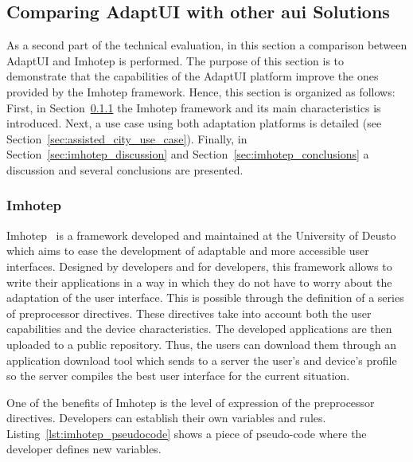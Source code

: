 \subsection{Comparing AdaptUI with other \ac{aui} Solutions}
\label{sec:imhotep_comparison}

As a second part of the technical evaluation, in this section a comparison 
between AdaptUI and Imhotep is performed. The purpose of this section is to 
demonstrate that the capabilities of the AdaptUI platform improve the ones 
provided by the Imhotep framework. Hence, this section is organized as follows: 
First, in Section~\ref{sec:imhotep_vs_adaptui} the Imhotep framework and its 
main characteristics is introduced. Next, a use case using both adaptation 
platforms is detailed (see Section~\ref{sec:assisted_city_use_case}). Finally, 
in Section~\ref{sec:imhotep_discussion} and Section~\ref{sec:imhotep_conclusions} 
a discussion and several conclusions are presented.

\subsubsection{Imhotep}
\label{sec:imhotep_vs_adaptui}

Imhotep~\citep{almeida_imhotep_2011} is a framework developed and maintained at
the University of Deusto which aims to ease the development of adaptable and 
more accessible user interfaces. Designed by developers and for developers, this
framework allows to write their applications in a way in which they do not
have to worry about the adaptation of the user interface. This is possible 
through the definition of a series of preprocessor directives. These 
directives take into account both the user capabilities and the device 
characteristics. The developed applications are then uploaded to a public 
repository. Thus, the users can download them through an application download 
tool which sends to a server the user's and device's profile so the server 
compiles the best user interface for the current situation.

One of the benefits of Imhotep is the level of expression of the preprocessor
directives. Developers can establish their own variables and rules.
Listing~\ref{lst:imhotep_pseudocode} shows a piece of pseudo-code where the
developer defines new variables.

\inputminted[linenos=true, fontsize=\footnotesize, frame=lines]{java}{5_experiments_and_results/imhotep_pseudocode.txt}


